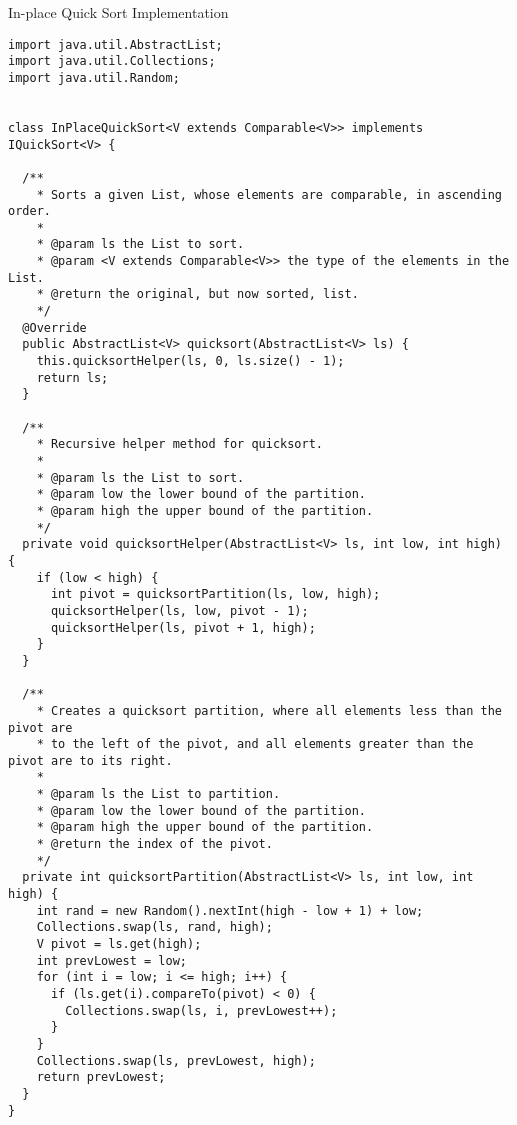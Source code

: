 \begin{cl}{In-place Quick Sort Implementation}
\begin{lstlisting}[language=MyJava]
import java.util.AbstractList;
import java.util.Collections;
import java.util.Random;


class InPlaceQuickSort<V extends Comparable<V>> implements IQuickSort<V> {

  /**
    * Sorts a given List, whose elements are comparable, in ascending order.
    *
    * @param ls the List to sort.
    * @param <V extends Comparable<V>> the type of the elements in the List.
    * @return the original, but now sorted, list.
    */
  @Override
  public AbstractList<V> quicksort(AbstractList<V> ls) {
    this.quicksortHelper(ls, 0, ls.size() - 1);
    return ls;
  }

  /**
    * Recursive helper method for quicksort.
    * 
    * @param ls the List to sort.
    * @param low the lower bound of the partition.
    * @param high the upper bound of the partition.
    */
  private void quicksortHelper(AbstractList<V> ls, int low, int high) {
    if (low < high) {
      int pivot = quicksortPartition(ls, low, high);
      quicksortHelper(ls, low, pivot - 1);
      quicksortHelper(ls, pivot + 1, high);
    }
  }

  /**
    * Creates a quicksort partition, where all elements less than the pivot are
    * to the left of the pivot, and all elements greater than the pivot are to its right.
    * 
    * @param ls the List to partition.
    * @param low the lower bound of the partition.
    * @param high the upper bound of the partition.
    * @return the index of the pivot.
    */
  private int quicksortPartition(AbstractList<V> ls, int low, int high) {
    int rand = new Random().nextInt(high - low + 1) + low;
    Collections.swap(ls, rand, high);
    V pivot = ls.get(high);
    int prevLowest = low;
    for (int i = low; i <= high; i++) {
      if (ls.get(i).compareTo(pivot) < 0) {
        Collections.swap(ls, i, prevLowest++);
      }
    }
    Collections.swap(ls, prevLowest, high);
    return prevLowest;
  }
}
\end{lstlisting}
\end{cl}